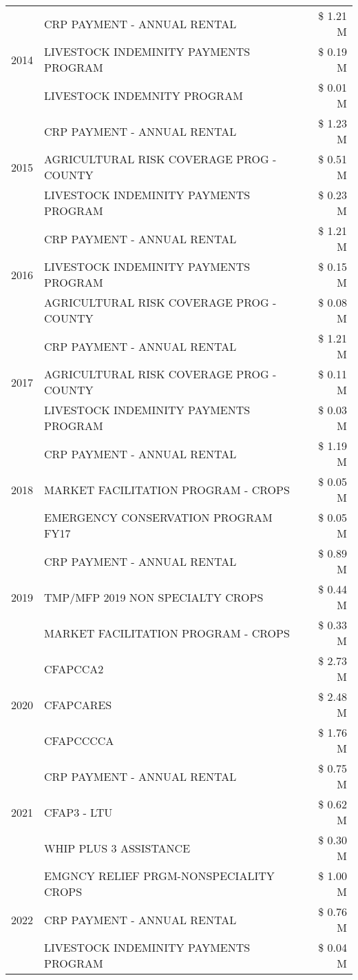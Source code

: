 \begin{tabular}{llr}
\cline{1-3}
\multirow[t]{3}{*}{2014} & CRP PAYMENT - ANNUAL RENTAL & \$ 1.21 M \\
 & LIVESTOCK INDEMINITY PAYMENTS PROGRAM & \$ 0.19 M \\
 & LIVESTOCK INDEMNITY PROGRAM & \$ 0.01 M \\
\cline{1-3}
\multirow[t]{3}{*}{2015} & CRP PAYMENT - ANNUAL RENTAL & \$ 1.23 M \\
 & AGRICULTURAL RISK COVERAGE PROG - COUNTY & \$ 0.51 M \\
 & LIVESTOCK INDEMINITY PAYMENTS PROGRAM & \$ 0.23 M \\
\cline{1-3}
\multirow[t]{3}{*}{2016} & CRP PAYMENT - ANNUAL RENTAL & \$ 1.21 M \\
 & LIVESTOCK INDEMINITY PAYMENTS PROGRAM & \$ 0.15 M \\
 & AGRICULTURAL RISK COVERAGE PROG - COUNTY & \$ 0.08 M \\
\cline{1-3}
\multirow[t]{3}{*}{2017} & CRP PAYMENT - ANNUAL RENTAL & \$ 1.21 M \\
 & AGRICULTURAL RISK COVERAGE PROG - COUNTY & \$ 0.11 M \\
 & LIVESTOCK INDEMINITY PAYMENTS PROGRAM & \$ 0.03 M \\
\cline{1-3}
\multirow[t]{3}{*}{2018} & CRP PAYMENT - ANNUAL RENTAL & \$ 1.19 M \\
 & MARKET FACILITATION PROGRAM - CROPS & \$ 0.05 M \\
 & EMERGENCY CONSERVATION PROGRAM FY17 & \$ 0.05 M \\
\cline{1-3}
\multirow[t]{3}{*}{2019} & CRP PAYMENT - ANNUAL RENTAL & \$ 0.89 M \\
 & TMP/MFP 2019 NON SPECIALTY CROPS & \$ 0.44 M \\
 & MARKET FACILITATION PROGRAM - CROPS & \$ 0.33 M \\
\cline{1-3}
\multirow[t]{3}{*}{2020} & CFAPCCA2 & \$ 2.73 M \\
 & CFAPCARES & \$ 2.48 M \\
 & CFAPCCCCA & \$ 1.76 M \\
\cline{1-3}
\multirow[t]{3}{*}{2021} & CRP PAYMENT - ANNUAL RENTAL & \$ 0.75 M \\
 & CFAP3 - LTU & \$ 0.62 M \\
 & WHIP PLUS 3 ASSISTANCE & \$ 0.30 M \\
\cline{1-3}
\multirow[t]{3}{*}{2022} & EMGNCY RELIEF PRGM-NONSPECIALITY CROPS & \$ 1.00 M \\
 & CRP PAYMENT - ANNUAL RENTAL & \$ 0.76 M \\
 & LIVESTOCK INDEMINITY PAYMENTS PROGRAM & \$ 0.04 M \\
\cline{1-3}
\bottomrule
\end{tabular}
